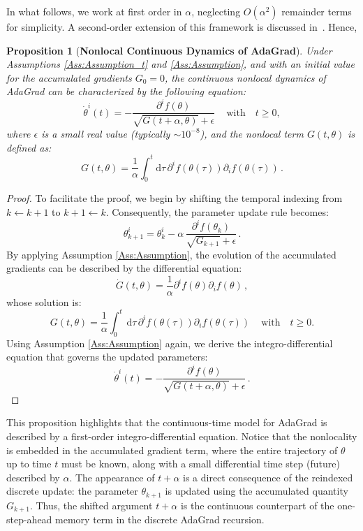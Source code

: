 \documentclass{article} %
\newtheorem{proposition}{Proposition}
\begin{document}
In what follows, we work at first order in \(\alpha\), neglecting \(O(\alpha^2)\) remainder terms for simplicity. A second-order extension of this framework is discussed in~\cite{heredia2026adamadamlikelagrangianssecondorder}. Hence, 
\begin{proposition}[\textbf{Nonlocal Continuous Dynamics of AdaGrad}]\label{prop:AdaGrad}
Under Assumptions \ref{Ass:Assumption_t} and \ref{Ass:Assumption}, and with an initial value for the accumulated gradients \( G_0 = 0 \), the continuous nonlocal dynamics of AdaGrad can be characterized by the following equation:
\begin{equation}\label{eq:AdaGrad_cont}
     \dot{\theta}^i(t) = - \frac{\partial^i f(\theta)}{\sqrt{G(t+\alpha, \theta)} + \epsilon}\,  \quad \text{with} \quad t \geq 0,
\end{equation}
where \( \epsilon \) is a small real value (typically \( \sim 10^{-8} \)), and the nonlocal term \( G(t, \theta) \) is defined as:
\begin{equation*}
    G(t, \theta) = \frac{1}{\alpha} \int^{t}_0 \mathrm{d}\tau\, \partial^i f(\theta(\tau)) \partial_i f(\theta(\tau))\,.
\end{equation*}
\end{proposition}
\begin{proof}
To facilitate the proof, we begin by shifting the temporal indexing from \( k \leftarrow k+1 \) to \( k+1 \leftarrow k \). Consequently, the parameter update rule becomes:
\[
\theta^i_{k+1} = \theta^i_{k} - \alpha\, \frac{\partial^i f(\theta_k)}{\sqrt{G_{k+1}} + \epsilon}\,.
\]
By applying Assumption \ref{Ass:Assumption}, the evolution of the accumulated gradients can be described by the differential equation:
\[
\dot{G}(t,\theta) = \frac{1}{\alpha} \partial^i f(\theta) \partial_i f(\theta)\,,
\]
whose solution is:
\[
G(t,\theta) = \frac{1}{\alpha} \int^t_0 \, \mathrm{d}\tau \, \partial^i f(\theta(\tau)) \partial_i f(\theta(\tau))\, \quad \text{with} \quad t\geq 0.
\]
Using Assumption \ref{Ass:Assumption} again, we derive the integro-differential equation that governs the updated parameters:
\[
\dot{\theta}^i(t) = - \frac{\partial^i f(\theta)}{\sqrt{G(t+\alpha, \theta)} + \epsilon}\,.
\]
\end{proof}
This proposition highlights that the continuous-time model for AdaGrad is described by a first-order integro-differential equation. Notice that the nonlocality is embedded in the accumulated gradient term, where the entire trajectory of \( \theta \) up to time \( t \) must be known, along with a small differential time step (future) described by \( \alpha \). The appearance of \(t+\alpha\) is a direct consequence of the reindexed discrete update: the parameter \(\theta_{k+1}\) is updated using the accumulated quantity \(G_{k+1}\). Thus, the shifted argument \(t+\alpha\) is the continuous counterpart of the one-step-ahead memory term in the
discrete AdaGrad recursion.
\end{document}
